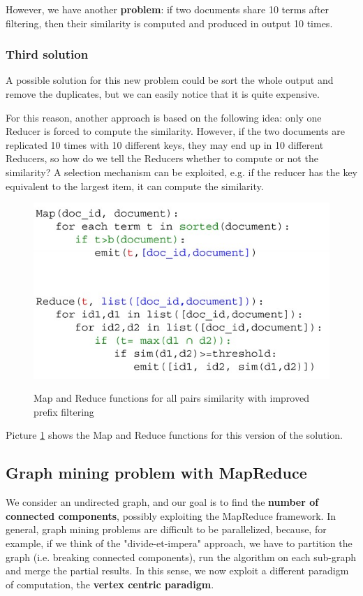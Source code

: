 However, we have another \textbf{problem}: if two documents share 10 terms after filtering, then their similarity is computed and produced in output 10 times.

\subsubsection{Third solution}
A possible solution for this new problem could be sort the whole output and remove the duplicates, but we can easily notice that it is quite expensive.

For this reason, another approach is based on the following idea: only one Reducer is forced to compute the similarity. However, if the two documents are replicated 10 times with 10 different keys, they may end up in 10 different Reducers, so how do we tell the Reducers whether to compute or not the similarity? A selection mechanism can be exploited, e.g. if the reducer has the key equivalent to the largest item, it can compute the similarity.

\begin{figure}[h!]
		\centering
		\includegraphics[scale = 2.0]{img/mr ex3.jpg}
        \label{mr all pairs3}
        \caption{Map and Reduce functions for all pairs similarity with improved prefix filtering}
\end{figure}

Picture \ref{mr all pairs3} shows the Map and Reduce functions for this version of the solution.

\subsection{Graph mining problem with MapReduce}
We consider an undirected graph, and our goal is to find the \textbf{number of connected components}, possibly exploiting the MapReduce framework. In general, graph mining problems are difficult to be parallelized, because, for example, if we think of the "divide-et-impera" approach, we have to partition the graph (i.e. breaking connected components), run the algorithm on each sub-graph and merge the partial results. In this sense, we now exploit a different paradigm of computation, the \textbf{vertex centric paradigm}.

